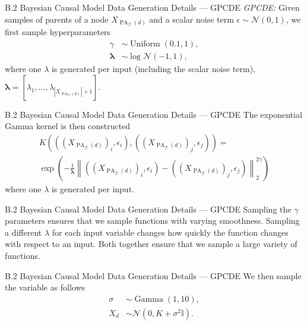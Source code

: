 \documentclass[aspectratio=169,10pt]{beamer}
\begin{document}
\begin{frame}{B.2 Bayesian Causal Model Data Generation Details --- GPCDE}
\textit{GPCDE:}\quad
Given samples of parents of a node $X_{\operatorname{PA}_{\mathcal{G}}(d)}$ and a scalar noise term $\epsilon\sim \mathcal{N}(0,1)$, we first sample hyperparameters
\begin{align*}
    \gamma &\sim \operatorname{Uniform}(0.1, 1), \\
    \bm{\lambda}
 &\sim \log \mathcal{N} (-1, 1),
\end{align*}
where one $\lambda$ is generated per input (including the scalar noise term), $\bm{\lambda} = \left[ \lambda_1, \ldots, \lambda_{|X_{\operatorname{PA}_{\mathcal{G}}(d)}| + 1} \right]$.
\end{frame}

\begin{frame}{B.2 Bayesian Causal Model Data Generation Details --- GPCDE}
\small
The exponential Gamma kernel is then constructed
\begin{align*}
K\left(\left(\left(X_{\operatorname{PA}_{\mathcal{G}}(d)} \right)_i,\epsilon_i\right),  \left(\left(X_{\operatorname{PA}_{\mathcal{G}}(d)} \right)_j,\epsilon_j \right)\right) = \\\exp\left( -\frac{1}{\bm{\lambda}}\left\| \left(\left(X_{\operatorname{PA}_{\mathcal{G}}(d)} \right)_i,\epsilon_i\right) - \left(\left(X_{\operatorname{PA}_{\mathcal{G}}(d)} \right)_j,\epsilon_j\right) \right\|^{2 \gamma}_2 \right)
\end{align*}
where one $\lambda$ is generated per input.
\end{frame}

\begin{frame}{B.2 Bayesian Causal Model Data Generation Details --- GPCDE}
Sampling the $\gamma$ parameters ensures that we sample functions with varying smoothness. Sampling a different $\lambda$ for each input variable changes how quickly the function changes with respect to an input. Both together ensure that we sample a large variety of functions.
\end{frame}

\begin{frame}{B.2 Bayesian Causal Model Data Generation Details --- GPCDE}
We then sample the variable as follows
\begin{align*}
    \sigma &\sim \operatorname{Gamma}(1, 10), \\
    X_{d} &\sim \mathcal{N}\left(0, K + \sigma^2 \mathbb{I} \right).
\end{align*}
\end{frame}
\end{document}
